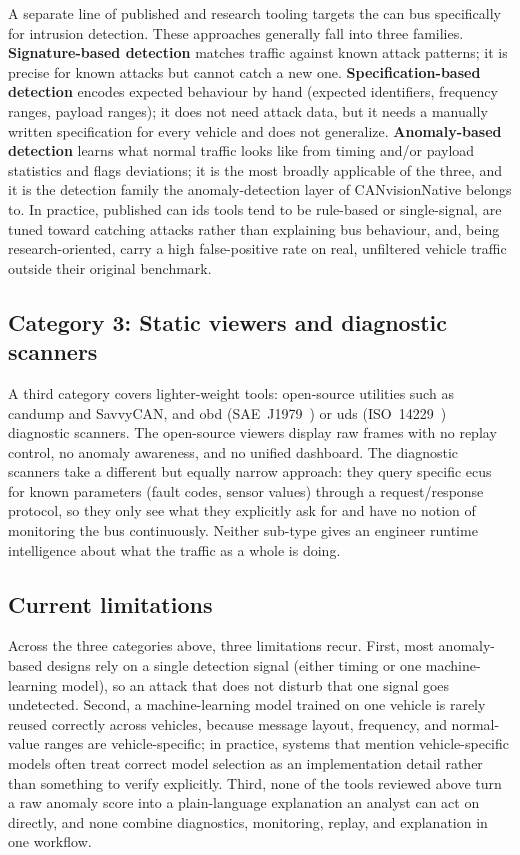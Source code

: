 A separate line of published and research tooling targets the \gls{can} bus specifically for intrusion detection. These approaches generally fall into three families. \textbf{Signature-based detection} matches traffic against known attack patterns; it is precise for known attacks but cannot catch a new one. \textbf{Specification-based detection} encodes expected behaviour by hand (expected identifiers, frequency ranges, payload ranges); it does not need attack data, but it needs a manually written specification for every vehicle and does not generalize. \textbf{Anomaly-based detection} learns what normal traffic looks like from timing and/or payload statistics and flags deviations; it is the most broadly applicable of the three, and it is the detection family the anomaly-detection layer of CANvisionNative belongs to. In practice, published \gls{can} \gls{ids} tools tend to be rule-based or single-signal, are tuned toward catching attacks rather than explaining bus behaviour, and, being research-oriented, carry a high false-positive rate on real, unfiltered vehicle traffic outside their original benchmark.

\subsection{Category 3: Static viewers and diagnostic scanners}

A third category covers lighter-weight tools: open-source utilities such as candump and SavvyCAN, and \gls{obd} (SAE~J1979~\cite{sae_j1979}) or \gls{uds} (ISO~14229~\cite{iso14229}) diagnostic scanners. The open-source viewers display raw frames with no replay control, no anomaly awareness, and no unified dashboard. The diagnostic scanners take a different but equally narrow approach: they query specific \gls{ecu}s for known parameters (fault codes, sensor values) through a request/response protocol, so they only see what they explicitly ask for and have no notion of monitoring the bus continuously. Neither sub-type gives an engineer runtime intelligence about what the traffic as a whole is doing.

\subsection{Current limitations}

Across the three categories above, three limitations recur. First, most anomaly-based designs rely on a single detection signal (either timing or one machine-learning model), so an attack that does not disturb that one signal goes undetected. Second, a machine-learning model trained on one vehicle is rarely reused correctly across vehicles, because message layout, frequency, and normal-value ranges are vehicle-specific; in practice, systems that mention vehicle-specific models often treat correct model selection as an implementation detail rather than something to verify explicitly. Third, none of the tools reviewed above turn a raw anomaly score into a plain-language explanation an analyst can act on directly, and none combine diagnostics, monitoring, replay, and explanation in one workflow.

